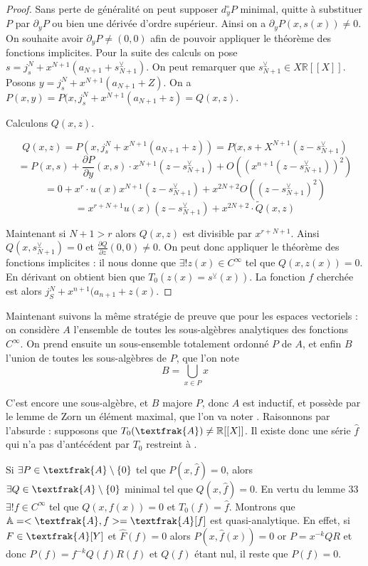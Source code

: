\documentclass[12pt,a4paper]{amsart}
\begin{document}
\begin{proof}

Sans perte de généralité on peut supposer $d^{\circ}_{y}P$ minimal, quitte à substituer $P$ par $\partial_{y}P$ ou bien une dérivée d'ordre supérieur. Ainsi on a $\partial_{y}P(x,s(x))\neq 0$. On souhaite avoir $\partial_{y}P \neq(0,0)$ afin de pouvoir appliquer le théorème des fonctions implicites. Pour la suite des calculs on pose $s=j^{N}_{s}+ x^{N+1} (a_{N+1}+ s^{\veebar}_{N+1})$. On peut remarquer que $s^{\veebar}_{N+1}\in X\mathbb{R}[[X]]$. Posons $y=j^{N}_{s}+ x^{N+1}(a_{N+1}+Z)$. On a $P(x,y)=P(x,j^{N}_{s}+ x^{N+1}(a_{N+1}+z)=Q(x,z). $ 

Calculons $Q(x,z)$. 

$$Q(x,z)=P(x, j^{N}_{s}+ x^{N+1}(a_{N+1}+z))=P(x,s+X^{N+1}(z-s^{\veebar}_{N+1})$$
$$=P(x,s)+ \dfrac{\partial P}{\partial y}(x,s)\cdot x^{N+1}(z-s^{\veebar}_{N+1}) + O((x^{n+1}(z-s^{\veebar}_{N+1}))^{2})$$
$$=0+x^{r}\cdot u(x) x^{N+1}(z-s^{\veebar}_{N+1})+ x^{2N+2} O((z-s^{\veebar}_{N+1})^{2})$$
$$=x^{r+N+1}u(x)(z-s^{\veebar}_{N+1})+x^{2N+2}\cdot \tilde{Q}(x,z)$$

Maintenant si $N+1> r $ alors $Q(x,z) $ est divisible par $x^{r+N+1}$. Ainsi $Q(x,s^{\veebar}_{N+1})=0$ et $\frac{\partial Q}{\partial z}(0,0) \neq 0$. On peut donc appliquer le théorème des fonctions implicites : il nous donne que $\exists ! z(x) \in C^{\infty}$ tel que $Q(x, z(x))=0$. En dérivant on obtient bien que $T_{0}(z(x)=s^{\veebar}(x))$. La fonction $f$ cherchée est alors $j^{N}_{S}+x^{n+1}(a_{n+1}+z(x)$. 

\end{proof}


Maintenant suivons la même stratégie de preuve que pour les espaces vectoriels : on considère $A$ l'ensemble de toutes les sous-algèbres analytiques des fonctions $C^{\infty}$. On prend ensuite un sous-ensemble totalement ordonné $P$ de $A$, et enfin $B$ l'union de toutes les sous-algèbres de $P$, que l'on note 
$$B =\bigcup_{x\in P} x$$ 

C'est encore une sous-algèbre, et $B$ majore $P$, donc $A$ est inductif, et possède par le lemme de Zorn un élément maximal, que l'on va noter . Raisonnons par l'absurde : supposons que $T_{0}(\textfrak{A})\neq \mathbb{R}[[X]]$. Il existe donc une série $\hat{f}$ qui n'a pas d'antécédent par $T_{0}$ restreint à . 

Si $\exists P \in \textfrak{A} \setminus \{0\} $ tel que $P(x,\hat{f})=0$, alors $\exists Q \in \textfrak{A} \setminus \{0\}$ minimal tel que  $Q(x,\hat{f})=0$. En vertu du lemme 33 $\exists ! f \in C^{\infty}$ tel que $Q(x,f(x))=0$ et $T_{0} (f)= \hat{f}$. Montrons que $\mathbb{A}=<\textfrak{A}, f> = \textfrak{A}[f]$ est quasi-analytique. En effet, si $F\in \textfrak{A}[Y]$ et $\hat{F}(f)=0$ alors $P(x, \hat{f}(x))=0$ or $P= x^{-k} Q R$ et donc $P(f) = f^{-k} Q(f) R(f)$ et $Q(f)$ étant nul, il reste que $P(f)=0$. \\
\end{document}
